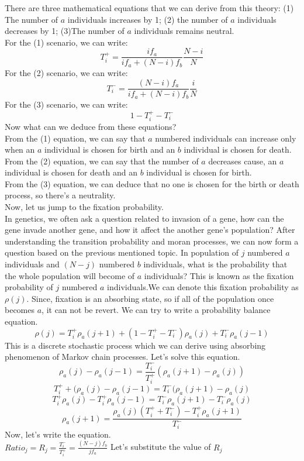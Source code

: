 \documentclass{article}
\begin{document}
There are three mathematical equations that we can derive from this theory: (1) The number of $a$ individuals increases by 1; (2) the number of $a$ individuals decreases by 1; (3)The number of $a$ individuals remains neutral.\\
For the (1) scenario, we can write:
\[T_i^+=\frac{if_a}{if_a+(N-i)f_b}\frac{N-i}{N}\]
For the (2) scenario, we can write:
\[T_i^-=\frac{(N-i)f_a}{if_a+(N-i)f_b}\frac{i}{N}\]
For the (3) scenario, we can write:
\[1-T_i^+-T_i^-\]
Now what can we deduce from these equations?\\
From the (1) equation, we can say that $a$ numbered individuals can increase only when an $a$ individual is chosen for birth and an $b$ individual is chosen for death.\\
From the (2) equation, we can say that the number of $a$ decreases cause, an $a$ individual is chosen for death and an $b$ individual is chosen for birth.\\
From the (3) equation, we can deduce that no one is chosen for the birth or death process, so there's a neutrality.\\
Now, let us jump to the fixation probability.\\
In genetics, we often ask a question related to invasion of a gene, how can the gene invade another gene, and how it affect the another gene's population?
After understanding the transition probability and moran processes, we can now form a question based on the previous mentioned topic. In population of $j$ numbered $a$ individuals and $(N-j)$ numbered $b$ individuals, what is the probability that the whole population will become of $a$ individuals?
This is known as the fixation probability of $j$ numbered $a$ individuals.We can denote this fixation probability as $\rho(j)$.
Since, fixation is an absorbing state, so if all of the population once becomes $a$, it can not be revert. We can try to write a probability balance equation.
\[\rho(j)=T_i^+\rho_a(j+1)+(1-T_i^+-T_i^-)\rho_a(j)+T_i^-\rho_a(j-1)\]
This is a discrete stochastic process which we can derive using absorbing phenomenon of Markov chain processes.
Let's solve this equation.
\[\rho_a(j)-\rho_a(j-1)=\frac{T_i^-}{T_i^+}(\rho_a(j+1)-\rho_a(j))\]
\[T_i^++(\rho_a(j)-\rho_a(j-1)=T_i^-(\rho_a(j+1)-\rho_a(j)\]
\[T_i^+\rho_a(j)-T_i^+\rho_a(j-1)=T_i^-\rho_a(j+1)-T_i^-\rho_a(j)\]
\[\rho_a(j+1)=\frac{\rho_a(j)(T_i^+ + T_i^-)-T_i^+\rho_a(j+1)}{T_i^-}\]
 Now, let's write the equation.\\
 $Ratio_j=R_j=\frac{T_i^-}{T_i^+}= \frac{(N-j)f_b}{jf_a}$
 Let's substitute the value of $R_j$
\end{document}
